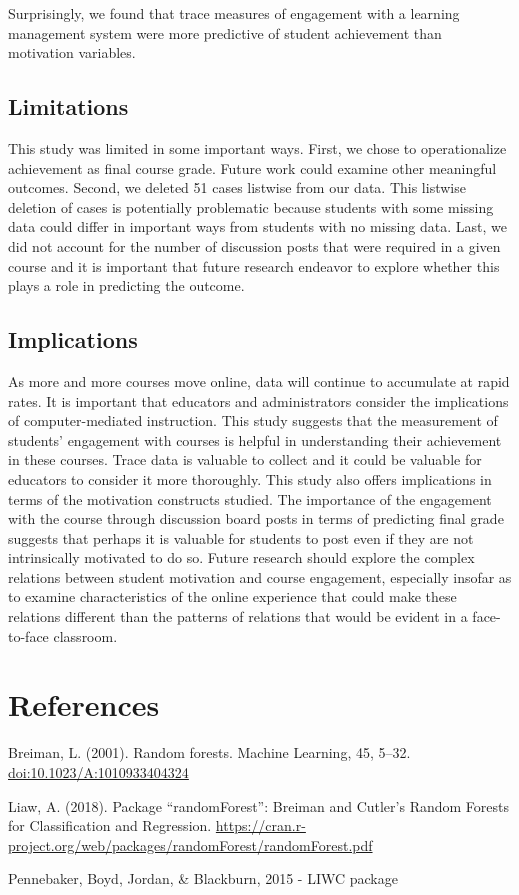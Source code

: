\documentclass[acmart]{apa6}
\theoremstyle{definition}
\theoremstyle{definition}
\theoremstyle{definition}
\theoremstyle{remark}
\begin{document}
Surprisingly, we found that trace measures of engagement with a learning
management system were more predictive of student achievement than
motivation variables.

\subsection{Limitations}\label{limitations}

This study was limited in some important ways. First, we chose to
operationalize achievement as final course grade. Future work could
examine other meaningful outcomes. Second, we deleted 51 cases listwise
from our data. This listwise deletion of cases is potentially
problematic because students with some missing data could differ in
important ways from students with no missing data. Last, we did not
account for the number of discussion posts that were required in a given
course and it is important that future research endeavor to explore
whether this plays a role in predicting the outcome.

\subsection{Implications}\label{implications}

As more and more courses move online, data will continue to accumulate
at rapid rates. It is important that educators and administrators
consider the implications of computer-mediated instruction. This study
suggests that the measurement of students' engagement with courses is
helpful in understanding their achievement in these courses. Trace data
is valuable to collect and it could be valuable for educators to
consider it more thoroughly. This study also offers implications in
terms of the motivation constructs studied. The importance of the
engagement with the course through discussion board posts in terms of
predicting final grade suggests that perhaps it is valuable for students
to post even if they are not intrinsically motivated to do so. Future
research should explore the complex relations between student motivation
and course engagement, especially insofar as to examine characteristics
of the online experience that could make these relations different than
the patterns of relations that would be evident in a face-to-face
classroom.

\newpage

\section{References}\label{references}

Breiman, L. (2001). Random forests. Machine Learning, 45, 5--32.
\url{doi:10.1023/A:1010933404324}

Liaw, A. (2018). Package \enquote{randomForest}: Breiman and Cutler's
Random Forests for Classification and Regression.
\url{https://cran.r-project.org/web/packages/randomForest/randomForest.pdf}

Pennebaker, Boyd, Jordan, \& Blackburn, 2015 - LIWC package

\begingroup
\setlength{\parindent}{-0.5in} \setlength{\leftskip}{0.5in}

\hypertarget{refs}{}

\endgroup
\end{document}
